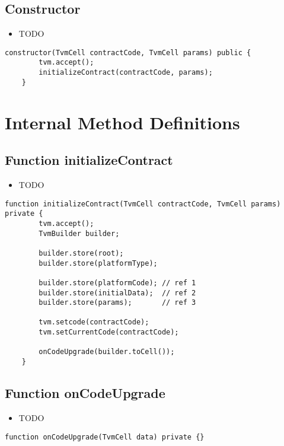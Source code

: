 \subsection{Constructor}

\noindent\begin{itemize}
\item TODO
\end{itemize}

\begin{lstlisting}[firstnumber=13]
    constructor(TvmCell contractCode, TvmCell params) public {
        tvm.accept();
        initializeContract(contractCode, params);
    }
\end{lstlisting}

\section{Internal Method Definitions}


\subsection{Function initializeContract}

\noindent\begin{itemize}
\item TODO
\end{itemize}

\begin{lstlisting}[firstnumber=18]
    function initializeContract(TvmCell contractCode, TvmCell params) private {
        tvm.accept();
        TvmBuilder builder;

        builder.store(root);
        builder.store(platformType);

        builder.store(platformCode); // ref 1
        builder.store(initialData);  // ref 2
        builder.store(params);       // ref 3

        tvm.setcode(contractCode);
        tvm.setCurrentCode(contractCode);

        onCodeUpgrade(builder.toCell());
    }
\end{lstlisting}

\subsection{Function onCodeUpgrade}

\noindent\begin{itemize}
\item TODO
\end{itemize}

\begin{lstlisting}[firstnumber=35]
    function onCodeUpgrade(TvmCell data) private {}
\end{lstlisting}
